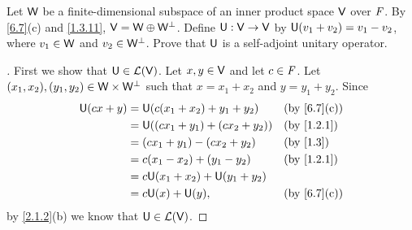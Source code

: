 \begin{ex}\label{ex:6.5.19}
  Let \(\mathsf{W}\) be a finite-dimensional subspace of an inner product space \(\mathsf{V}\) over \(\mathit{F}\).
  By \cref{6.7}(c) and \cref{1.3.11}, \(\mathsf{V} = \mathsf{W} \oplus \mathsf{W}^{\perp}\).
  Define \(\mathsf{U} : \mathsf{V} \to \mathsf{V}\) by \(\mathsf{U}(v_1 + v_2) = v_1 - v_2\), where \(v_1 \in \mathsf{W}\) and \(v_2 \in \mathsf{W}^{\perp}\).
  Prove that \(\mathsf{U}\) is a self-adjoint unitary operator.
\end{ex}

\begin{proof}[]
  First we show that \(\mathsf{U} \in \mathcal{L}(\mathsf{V})\).
  Let \(x, y \in \mathsf{V}\) and let \(c \in \mathit{F}\).
  Let \((x_1, x_2), (y_1, y_2) \in \mathsf{W} \times \mathsf{W}^{\perp}\) such that \(x = x_1 + x_2\) and \(y = y_1 + y_2\).
  Since
  \begin{align*}
    \U(cx + y) & = \U(c(x_1 + x_2) + y_1 + y_2)    &  & \by{6.7}[c] \\
               & = \U((cx_1 + y_1) + (cx_2 + y_2)) &  & \by{1.2.1}  \\
               & = (cx_1 + y_1) - (cx_2 + y_2)     &  & \by{1.3}    \\
               & = c (x_1 - x_2) + (y_1 - y_2)     &  & \by{1.2.1}  \\
               & = c \U(x_1 + x_2) + \U(y_1 + y_2)                  \\
               & = c \U(x) + \U(y),                &  & \by{6.7}[c]
  \end{align*}
  by \cref{2.1.2}(b) we know that \(\mathsf{U} \in \mathcal{L}(\mathsf{V})\).


\end{proof}
